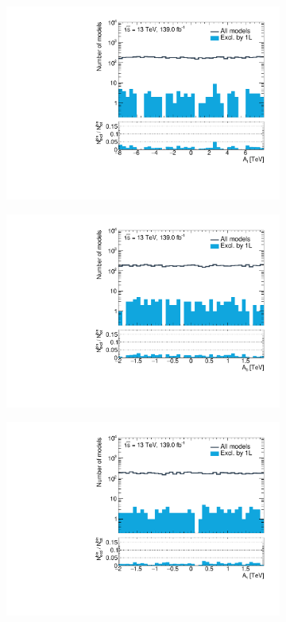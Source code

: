 \begin{figure}
	\centering
	\begin{subfigure}[b]{0.4\linewidth}
		\centering\includegraphics[width=\textwidth]{1D/At}
	\end{subfigure}
	\begin{subfigure}[b]{0.4\linewidth}
		\centering\includegraphics[width=\textwidth]{1D/Ab}
	\end{subfigure}
	\begin{subfigure}[b]{0.4\linewidth}
		\centering\includegraphics[width=\textwidth]{1D/Atau}

\end{subfigure}
\end{figure}
